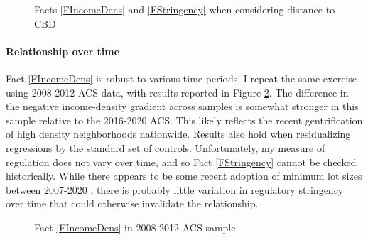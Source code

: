 \documentclass[12pt]{article}
\begin{document}
	\begin{figure}[htbp!]
		\caption{Facts \ref{FIncomeDens} and \ref{FStringency} when considering distance to CBD}\label{figure:CBD_Facts}
		
	\end{figure}
	
	
	\paragraph*{Relationship over time} Fact \ref{FIncomeDens} is robust to various time periods. I repeat the same exercise using 2008-2012 ACS data, with results reported in Figure \ref{figure:incSort_hist}. The difference in the negative income-density gradient across samples is somewhat stronger in this sample relative to the 2016-2020 ACS. This likely reflects the recent gentrification of high density neighborhoods nationwide. Results also hold when residualizing regressions by the standard set of controls. Unfortunately, my measure of regulation does not vary over time, and so Fact \ref{FStringency} cannot be checked historically. While there appears to be some recent adoption of minimum lot sizes between 2007-2020 \citep{gyourko2021},  there is probably little variation in regulatory stringency over time that could otherwise invalidate the relationship. 
	
	\begin{figure}[htbp!]
		\caption{Fact \ref{FIncomeDens} in 2008-2012 ACS sample}\label{figure:incSort_hist}
		
	\end{figure}
	
\end{document}
